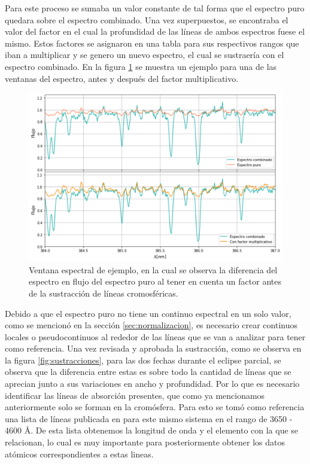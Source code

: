 \documentclass[12pt,oneside,openany,letter]{book}
\begin{document}
Para este proceso se sumaba un valor constante de tal forma que el espectro puro quedara sobre el espectro combinado. Una vez superpuestos, se encontraba el valor del factor en el cual la profundidad de las líneas de ambos espectros fuese el mismo. Estos factores se asignaron en una tabla para sus respectivos rangos que iban a multiplicar y se genero un nuevo espectro, el cual se sustraería con el espectro combinado. En la figura \ref{fig:ej_sus} se muestra un ejemplo para una de las ventanas del espectro, antes y después del factor multiplicativo.

\begin{figure}[h]
    \centering
    \includegraphics[width=1\linewidth]{Gaficas/factor_mult.png}
    \caption{Ventana espectral de ejemplo, en la cual se observa la diferencia del espectro en flujo del espectro puro al tener en cuenta un factor antes de la sustracción de líneas cromosféricas.}
    \label{fig:ej_sus}
\end{figure}


Debido a que el espectro puro no tiene un continuo espectral en un solo valor, como se mencionó en la sección \ref{sec:normalizacion}, es necesario crear continuos locales o pseudocontinuos al rededor de las líneas que se van a analizar para tener como referencia. Una vez revisada y aprobada la sustracción, como se observa en la figura \ref{fig:sustracciones}, para las dos fechas durante el eclipse parcial, se observa que la diferencia entre estas es sobre todo la cantidad de líneas que se aprecian junto a sus variaciones en ancho y profundidad. Por lo que es necesario identificar las líneas de absorción presentes, que como ya mencionamos anteriormente solo se forman en la cromósfera. Para esto se tomó como referencia una lista de líneas publicada en \citep{kps9} para este mismo sistema en el rango de 3650 - 4600 \r{A}. De esta lista obtenemos la longitud de onda y el elemento con la que se relacionan, lo cual es muy importante para posteriormente obtener los datos atómicos correspondientes a estas lineas.
\end{document}
